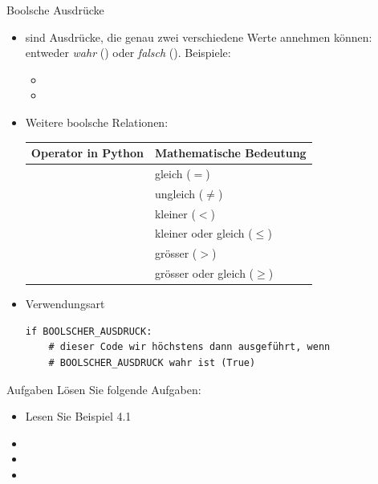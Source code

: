 \begin{frame}[fragile]{Boolsche Ausdrücke}
\begin{itemize}
    \item {} sind Ausdrücke, die genau zwei verschiedene Werte annehmen können: entweder \textit{wahr} () oder \textit{falsch} (). Beispiele:
    \begin{itemize}
        \item {}
        \item {}
    \end{itemize}
    \item Weitere boolsche Relationen:
    \begin{table}[H]
        \centering
        \begin{tabular}{r|l}
        \textbf{Operator in Python} & \textbf{Mathematische Bedeutung} \\\midrule 
             \pythoninline{==} & gleich ($=$)\\
             \pythoninline{!=} & ungleich ($\neq$) \\
             \pythoninline{<} & kleiner ($<$)\\
             \pythoninline{<=} & kleiner oder gleich ($\leq$) \\
             \pythoninline{>} & grösser ($>$) \\
             \pythoninline{>=} & grösser oder gleich ($\geq$)
        \end{tabular}
    \end{table}
    \item Verwendungsart
\begin{lstlisting}
if BOOLSCHER_AUSDRUCK:
    # dieser Code wir höchstens dann ausgeführt, wenn 
    # BOOLSCHER_AUSDRUCK wahr ist (True)
\end{lstlisting}
\end{itemize}
   
\end{frame}

\begin{frame}{Aufgaben}
Lösen Sie folgende Aufgaben:
\begin{itemize}
    \item Lesen Sie Beispiel 4.1
    \item {}
    \item {}
    \item {}
\end{itemize}

\end{frame}
